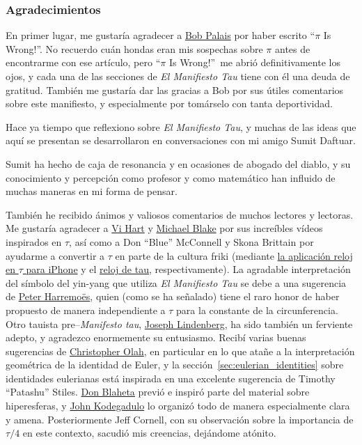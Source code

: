 
  \subsubsection{Agradecimientos} %
  \label{sec:acknowledgments}

En primer lugar, me gustaría agradecer a \href{http://www.math.utah.edu/~palais}{Bob Palais} por haber escrito ``$\pi$ Is Wrong!''. No recuerdo cuán hondas eran mis sospechas sobre $\pi$ antes de encontrarme con ese artículo, pero ``$\pi$ Is Wrong!''\ me abrió definitivamente los ojos, y cada una de las secciones de \emph{El Manifiesto Tau} tiene con él una deuda de gratitud. También me gustaría dar las gracias a Bob por sus útiles comentarios sobre este manifiesto, y especialmente por tomárselo con tanta deportividad.

Hace ya tiempo que reflexiono sobre \emph{El Manifiesto Tau}, y muchas de las ideas que aquí se presentan se desarrollaron en conversaciones con mi amigo Sumit Daftuar.

Sumit ha hecho de caja de resonancia y en ocasiones de abogado del diablo, y su conocimiento y percepción como profesor y como matemático han influido de muchas maneras en mi forma de pensar.

También he recibido ánimos y valiosos comentarios de muchos lectores y lectoras. Me gustaría agradecer a \href{http://www.youtube.com/watch?v=jG7vhMMXagQ}{Vi Hart} y \href{http://www.youtube.com/watch?v=3174T-3-59Q}{Michael Blake} por sus increíbles vídeos inspirados en $\tau$, así como a Don ``Blue'' McConnell y Skona Brittain por ayudarme a convertir a $\tau$ en parte de la cultura friki (mediante \href{http://tauclock.com/}{la aplicación reloj en $\tau$ para iPhone} y el \href{http://www.sbcrafts.net/clocks/}{reloj de tau}, respectivamente). La agradable interpretación del símbolo del yin-yang que utiliza \emph{El Manifiesto Tau} se debe a una sugerencia de \href{http://www.harremoes.dk/Peter/}{Peter Harremo\"{e}s}, quien (como se ha señalado) tiene el raro honor de haber propuesto de manera independiente a $\tau$ para la constante de la circunferencia. Otro tauista pre--\emph{Manifesto tau}, \href{https://sites.google.com/site/taubeforeitwascool/}{Joseph Lindenberg}, ha sido también un ferviente adepto, y agradezco enormemente su entusiasmo. Recibí varias buenas sugerencias de \href{http://christopherolah.wordpress.com/about-me}{Christopher Olah}, en particular en lo que atañe a la interpretación geométrica de la identidad de Euler, y la sección~\ref{sec:eulerian_identities} sobre identidades eulerianas está inspirada en una excelente sugerencia de Timothy ``Patashu'' Stiles. \href{http://www.blahedo.org/blog/archives/001083.html}{Don Blaheta} previó e inspiró parte del material sobre hiperesferas, y \href{http://spikedmath.com/forum/viewtopic.php?f=30&t=147\#p1577}{John Kodegadulo} lo organizó todo de manera especialmente clara y amena. Posteriormente Jeff Cornell, con su observación sobre la importancia de $\tau/4$ en este contexto, sacudió mis creencias, dejándome atónito.

